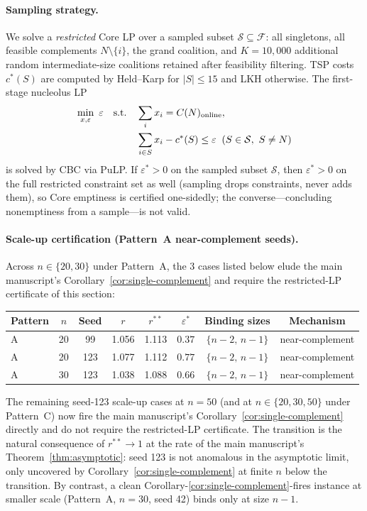 \documentclass[11pt]{article}
\theoremstyle{plain}
\theoremstyle{definition}
\theoremstyle{remark}
\begin{document}
\paragraph{Sampling strategy.} We solve a \emph{restricted} Core LP over a sampled subset $\mathcal{S}\subseteq\mathcal{F}$: all singletons, all feasible complements $N\setminus\{i\}$, the grand coalition, and $K=10{,}000$ additional random intermediate-size coalitions retained after feasibility filtering. TSP costs $c^{\ast}(S)$ are computed by Held--Karp for $|S|\le 15$ and LKH \citep{helsgaun2000effective} otherwise. The first-stage nucleolus LP
\begin{align}
  \min_{x,\varepsilon}\ \varepsilon\quad\text{s.t.}\quad
  & \sum_i x_i = C(N)_{\text{online}}, \notag \\
  & \sum_{i\in S} x_i - c^{\ast}(S)\le \varepsilon\;\;(S\in\mathcal{S},\ S\ne N) \notag
\end{align}
is solved by CBC via PuLP. If $\varepsilon^{\ast}>0$ on the sampled subset $\mathcal{S}$, then $\varepsilon^{\ast}>0$ on the full restricted constraint set as well (sampling drops constraints, never adds them), so Core emptiness is certified one-sidedly; the converse---concluding nonemptiness from a sample---is not valid.

\paragraph{Scale-up certification (Pattern~A near-complement seeds).} Across $n\in\{20,30\}$ under Pattern~A, the 3 cases listed below elude the main manuscript's Corollary~\ref{cor:single-complement} and require the restricted-LP certificate of this section:
\begin{center}
\footnotesize
\begin{tabular}{@{}lccccccc@{}}
\toprule
Pattern & $n$ & Seed & $r$ & $r^{\ast\ast}$ & $\varepsilon^{\ast}$ & Binding sizes & Mechanism \\
\midrule
A & 20 &  99 & 1.056 & 1.113 & $0.37$ & $\{n-2,\,n-1\}$ & near-complement \\
A & 20 & 123 & 1.077 & 1.112 & $0.77$ & $\{n-2,\,n-1\}$ & near-complement \\
A & 30 & 123 & 1.038 & 1.088 & $0.66$ & $\{n-2,\,n-1\}$ & near-complement \\
\bottomrule
\end{tabular}
\end{center}
The remaining seed-123 scale-up cases at $n=50$ (and at $n\in\{20,30,50\}$ under Pattern~C) now fire the main manuscript's Corollary~\ref{cor:single-complement} directly and do not require the restricted-LP certificate. The transition is the natural consequence of $r^{\ast\ast}\to 1$ at the rate of the main manuscript's Theorem~\ref{thm:asymptotic}: seed 123 is not anomalous in the asymptotic limit, only uncovered by Corollary~\ref{cor:single-complement} at finite $n$ below the transition. By contrast, a clean Corollary-\ref{cor:single-complement}-fires instance at smaller scale (Pattern~A, $n=30$, seed 42) binds only at size $n-1$.
\end{document}

